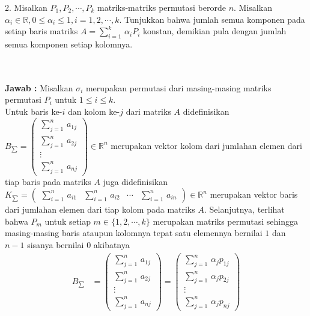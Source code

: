 \documentclass[11pt,a4paper]{article}
\newcommand{\ds}{\displaystyle}
\theoremstyle{plain}
\theoremstyle{definition}
\theoremstyle{remark}
\begin{document}
\begin{enumerate}
\begin{enumerate}
	\- \\ \- \\
	\textbf{Jawab :} Misalkan $\sigma_{i}$ merupakan permutasi dari masing-masing matriks permutasi $P_{i}$ untuk $1\le i\le k$.\\
	Untuk baris ke-$i$ dan kolom ke-$j$ dari matriks $A$ didefinisikan $\ds B_{\sum} = \begin{pmatrix} 
	\ds \sum_{j=1}^{n}\, a_{1j}\\ 
	\ds \sum_{j=1}^{n}\, a_{2j}\\ 
	\vdots \\
	\ds \sum_{j=1}^{n}\, a_{nj}
	\end{pmatrix}\in \mathbb{R}^{n}$ merupakan vektor kolom dari jumlahan elemen dari tiap baris pada matriks $A$ juga didefinisikan $\ds K_{\sum} = \begin{pmatrix}
	\ds \sum_{i=1}^{n}\, a_{i1} & 
	\ds \sum_{i=1}^{n}\, a_{i2} & 
	\cdots &
	\ds \sum_{i=1}^{n}\, a_{in}
	\end{pmatrix}\in \mathbb{R}^{n}$ merupakan vektor baris dari jumlahan elemen dari tiap kolom pada matriks $A$. Selanjutnya, terlihat bahwa $P_{m}$ untuk setiap $m\in \{ 1,2,\cdots,k\}$ merupakan matriks permutasi sehingga masing-masing baris ataupun kolomnya tepat satu elemennya bernilai $1$ dan $n-1$ sisanya bernilai $0$ akibatnya 
	\begin{align*}
	B_{\sum} &= \begin{pmatrix} 
	\ds \sum_{j=1}^{n}\, a_{1j}\\ 
	\ds \sum_{j=1}^{n}\, a_{2j}\\ 
	\vdots \\
	\ds \sum_{j=1}^{n}\, a_{nj}
	\end{pmatrix} 
	= \begin{pmatrix} 
	\ds \sum_{j=1}^{n}\, \alpha_{j} p_{1j}\\ 
	\ds \sum_{j=1}^{n}\, \alpha_{j}p_{2j}\\ 
	\vdots \\
	\ds \sum_{j=1}^{n}\, \alpha_{j}p_{nj}
	\end{pmatrix} 

\end{align*}
\end{enumerate}
\end{enumerate}
\end{document}
